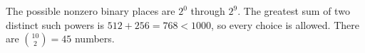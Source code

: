 The possible nonzero binary places are $2^0$ through $2^9$. The greatest sum of two distinct such powers is $512+256=768<1000$, so every choice is allowed. There are $\binom{10}{2}=\boxed{45}$ numbers.
